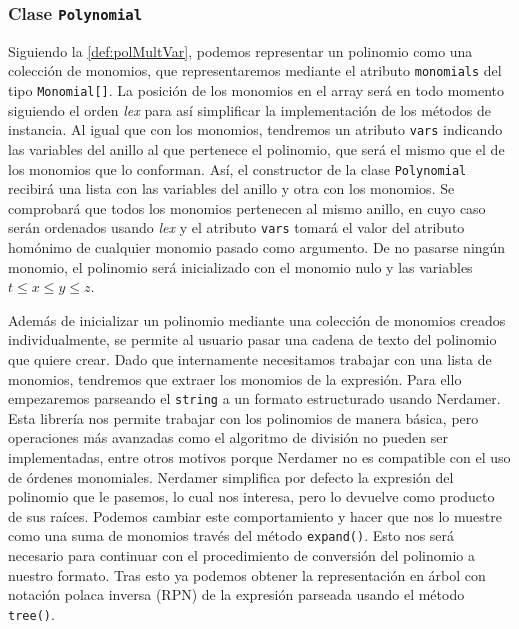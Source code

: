 \subsubsection{Clase \texttt{Polynomial}}
Siguiendo la \autoref{def:polMultVar}, podemos representar un polinomio como una colección de monomios, que representaremos mediante el atributo \texttt{monomials} del tipo \texttt{Monomial[]}. La posición de los monomios en el array será en todo momento siguiendo el orden \textit{lex} para así simplificar la implementación de los métodos de instancia. Al igual que con los monomios, tendremos un atributo \texttt{vars} indicando las variables del anillo al que pertenece el polinomio, que será el mismo que el de los monomios que lo conforman. Así, el constructor de la clase \texttt{Polynomial} recibirá una lista con las variables del anillo y otra con los monomios. Se comprobará que todos los monomios pertenecen al mismo anillo, en cuyo caso serán ordenados usando \textit{lex} y el atributo \texttt{vars} tomará el valor del atributo homónimo de cualquier monomio pasado como argumento. De no pasarse ningún monomio, el polinomio será inicializado con el monomio nulo y las variables $t\le x\le y \le z$.\newline

Además de inicializar un polinomio mediante una colección de monomios creados individualmente, se permite al usuario pasar una cadena de texto del polinomio que quiere crear. Dado que internamente necesitamos trabajar con una lista de monomios, tendremos que extraer los monomios de la expresión. Para ello empezaremos parseando el \texttt{string} a un formato estructurado usando Nerdamer. Esta librería nos permite trabajar con los polinomios de manera básica, pero operaciones más avanzadas como el algoritmo de división no pueden ser implementadas, entre otros motivos porque Nerdamer no es compatible con el uso de órdenes monomiales. Nerdamer simplifica por defecto la expresión del polinomio que le pasemos, lo cual nos interesa, pero lo devuelve como producto de sus raíces. Podemos cambiar este comportamiento y hacer que nos lo muestre como una suma de monomios través del método \texttt{expand()}. Esto nos será necesario para continuar con el procedimiento de conversión del polinomio a nuestro formato. Tras esto ya podemos obtener la representación en árbol con notación polaca inversa (RPN) de la expresión parseada usando el método \texttt{tree()}.\newline

